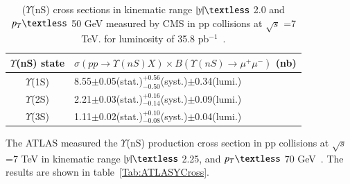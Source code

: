 



\begin{table}
  \begin{center}
    \caption[]{ ($\Upsilon$(nS) cross sections
  in kinematic range $|y|\textless$ 2.0 and $p_{T}\textless$ 50 GeV 
      measured by CMS in pp collisions at $\surd s$ =7 TeV.
  for luminosity of 35.8 pb$^{-1}$~\cite{CMS:2015xqv}.}
\label{Tab:CMSYCrossPLB}
\begin{tabular}{cl} 
\hline 
\hline
$\Upsilon$(nS) state             &$ \sigma(pp \rightarrow \Upsilon(nS)X) \times B(\Upsilon(nS)\rightarrow\mu^{+}\mu^{-})$ (nb)    \\              
\hline
$\Upsilon$(1S)                   &8.55$\pm$0.05(stat.)$^{+0.56}_{-0.50}$(syst.)$\pm$0.34(lumi.)\\
$\Upsilon$(2S)                   &2.21$\pm$0.03(stat.)$^{+0.16}_{-0.14}$(syst.)$\pm$0.09(lumi.)\\
$\Upsilon$(3S)                   &1.11$\pm$0.02(stat.)$^{+0.10}_{-0.08}$(syst.)$\pm$0.04(lumi.)\\
\hline
\hline
\end{tabular}
\end{center}
\end{table}


The ATLAS measured the $\Upsilon$(nS) production cross section
in pp collisions at $\surd s$ =7 TeV in kinematic range $|y|\textless$ 2.25,
and $p_{T}\textless$ 70 GeV~\cite{ATLAS:2012lmu}.  
The results are shown in table~\ref{Tab:ATLASYCross}.


